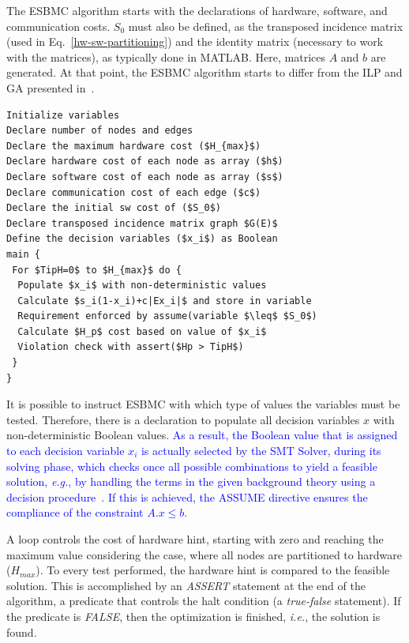 \documentclass{doublecol-new}
\theoremstyle{TH}{
\newtheorem{lemma}{Lemma}
\newtheorem{theorem}[lemma]{Theorem}
\newtheorem{corrolary}[lemma]{Corrolary}
\newtheorem{conjecture}[lemma]{Conjecture}
\newtheorem{proposition}[lemma]{Proposition}
\newtheorem{claim}[lemma]{Claim}
\newtheorem{stheorem}[lemma]{Wrong Theorem}
\newtheorem{algorithm}{Algorithm}
}
\theoremstyle{THrm}{
\newtheorem{definition}{Definition}[section]
\newtheorem{question}{Question}[section]
\newtheorem{remark}{Remark}
\newtheorem{scheme}{Scheme}
}
\theoremstyle{THhit}{
\newtheorem{case}{Case}[section]
}
\begin{document}

The ESBMC algorithm starts with the declarations of hardware, software, and communication costs. $S_0$ must also be defined, as the transposed incidence matrix (used in Eq.~\eqref{hw-sw-partitioning}) and the identity matrix (necessary to work with the matrices), as typically done in MATLAB. Here, matrices $A$ and $b$ are generated. At that point, the ESBMC algorithm starts to differ from the ILP and GA presented in~\cite{Trindade2015}.

\begin{lstlisting}[basicstyle=\footnotesize,caption={Pseudocode describing sequential ESBMC.},label={Pseudocode-describing-ESBMC},numbersep=7pt,frame=tb,captionpos=t,numberstyle=\tiny,mathescape=true]
Initialize variables 
Declare number of nodes and edges
Declare the maximum hardware cost ($H_{max}$)
Declare hardware cost of each node as array ($h$)
Declare software cost of each node as array ($s$)
Declare communication cost of each edge ($c$)
Declare the initial sw cost of ($S_0$)
Declare transposed incidence matrix graph $G(E)$
Define the decision variables ($x_i$) as Boolean
main {
 For $TipH=0$ to $H_{max}$ do {
  Populate $x_i$ with non-deterministic values
  Calculate $s_i(1-x_i)+c|Ex_i|$ and store in variable
  Requirement enforced by assume(variable $\leq$ $S_0$)
  Calculate $H_p$ cost based on value of $x_i$
  Violation check with assert($Hp > TipH$)
 }
}
\end{lstlisting}

\vspace{2 mm}
It is possible to instruct ESBMC with which type of values the variables must be tested. Therefore, there is a declaration to populate all decision variables $x$ with non-deterministic Boolean values. \textcolor{blue}{As a result, the Boolean value that is assigned to each decision variable $x_i$ is actually selected by the SMT Solver, during its solving phase, which checks once all possible combinations to yield a feasible solution, {\it e.g.}, by handling the terms in the given background theory using a decision procedure~\cite{DeMoura2008,Brummayer2009}. If this is achieved, the ASSUME directive ensures the compliance of the constraint $A.x \leq b$}.

A loop controls the cost of hardware hint, starting with zero and reaching the maximum value considering the case, where all nodes are partitioned to hardware ($H_{max}$). To every test performed, the hardware hint is compared to the feasible solution. This is accomplished by an \textit{ASSERT} statement at the end of the algorithm, a predicate that controls the halt condition (a \textit{true-false} statement). If the predicate is \textit{FALSE}, then the optimization is finished, {\it i.e.}, the solution is found. 
\end{document}
